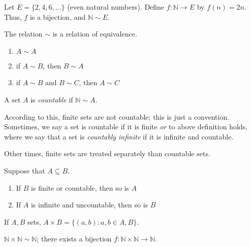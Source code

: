 \documentclass[12pt]{article}
\begin{document}
\begin{example}
  Let $E = \{2, 4, 6, \dots\}$ (even natural numbers). Define $f : \mathbb{N} \to E$ by $f(n) = 2n$. Thus, $f$ is a bijection, and $\mathbb{N} \sim E$.\footnotemark
\end{example}


\begin{theorem}
  The relation $\sim$ is a relation of equivalence.
  \begin{enumerate}
    \item $A \sim A$
    \item if $A \sim B$, then $B \sim A$
    \item if $A \sim B$ and $B \sim C$, then $A \sim C$
  \end{enumerate}
\end{theorem}

\begin{definition}[Countable]
  A set $A$ is \emph{countable} if $\mathbb{N} \sim A$.
\end{definition}

\begin{remark}
  According to this, finite sets are not countable; this is just a convention. Sometimes, we say a set is countable if it is finite \textit{or} to above definition holds, where we say that a set is \emph{countably infinite} if it is infinite and countable.

  Other times, finite sets are treated separately than countable sets.
\end{remark}

\begin{theorem}\label{thm:basicfactI}
  Suppose that $A \subseteq B$.
  \begin{enumerate}
    \item If $B$ is finite or countable, then so is $A$
    \item If $A$ is infinite and uncountable, then so is $B$
  \end{enumerate}
\end{theorem}

\begin{definition}
  If $A, B$ sets, $A \times B = \{(a,b) :a,b \in A,B\}$.
\end{definition}

\begin{proposition}\label{prop:basicfactII}
  $\mathbb{N}\times \mathbb{N} \sim \mathbb{N}$; there exists a bijection $f: \mathbb{N} \times \mathbb{N} \to \mathbb{N}$.
\end{proposition}
\end{document}
